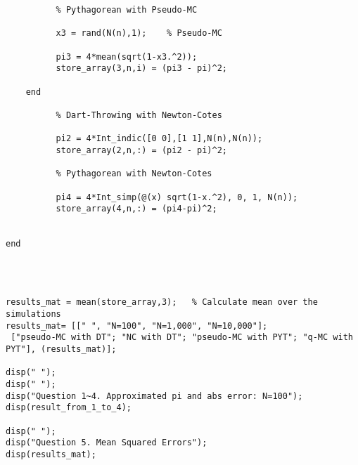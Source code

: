 \documentclass[10pt, letterpaper]{article}
\begin{document}
\begin{verbatim}
          % Pythagorean with Pseudo-MC
        
          x3 = rand(N(n),1);    % Pseudo-MC 
         
          pi3 = 4*mean(sqrt(1-x3.^2));
          store_array(3,n,i) = (pi3 - pi)^2;
          
    end
    
          % Dart-Throwing with Newton-Cotes
           
          pi2 = 4*Int_indic([0 0],[1 1],N(n),N(n));     
          store_array(2,n,:) = (pi2 - pi)^2;
          
          % Pythagorean with Newton-Cotes

          pi4 = 4*Int_simp(@(x) sqrt(1-x.^2), 0, 1, N(n));
          store_array(4,n,:) = (pi4-pi)^2;
          
          
end



                   
results_mat = mean(store_array,3);   % Calculate mean over the simulations
results_mat= [[" ", "N=100", "N=1,000", "N=10,000"];
 ["pseudo-MC with DT"; "NC with DT"; "pseudo-MC with PYT"; "q-MC with PYT"], (results_mat)];

disp(" ");
disp(" ");
disp("Question 1~4. Approximated pi and abs error: N=100");
disp(result_from_1_to_4);

disp(" ");
disp("Question 5. Mean Squared Errors");
disp(results_mat);

\end{verbatim}
                     
\end{document}
